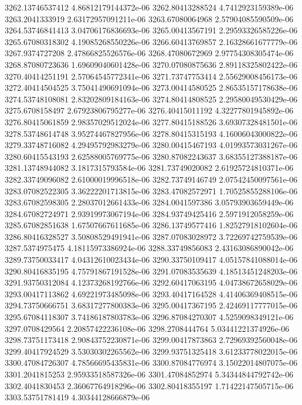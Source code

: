 {3262.13746537412 4.86812179144372e-06
3262.80413288524 4.7412923159389e-06
3263.2041333919 2.63172957091211e-06
3263.67080064968 2.57904085590509e-06
3264.53746841413 3.04706176836693e-06
3265.00413567191 2.29593326585226e-06
3265.67080318302 4.19085268550226e-06
3266.60413769857 2.16328661677779e-06
3267.9374727208 2.47866825526576e-06
3268.47080672969 2.97754308305474e-06
3268.87080723636 1.69609040601428e-06
3270.07080875636 2.89118325802422e-06
3270.40414251191 2.57064545772341e-06
3271.73747753414 2.55629008456173e-06
3272.40414504525 3.75041490691094e-06
3273.00414580525 2.86535157178638e-06
3274.53748108081 2.83202809184163e-06
3274.80414808525 2.29580049530429e-06
3275.6708158497 2.67923806795277e-06
3276.40415011192 4.32277801945892e-06
3276.80415061859 2.98357029512024e-06
3277.80415188526 3.69307328481501e-06
3278.53748614748 3.95274467827956e-06
3278.80415315193 4.16006043000822e-06
3279.33748716082 4.29495792983279e-06
3280.00415467193 4.01993573031267e-06
3280.60415543193 2.62588005769775e-06
3280.87082243637 3.68355127388187e-06
3281.13748944082 3.1817315793584e-06
3281.73749020082 2.61925724810371e-06
3282.33749096082 2.61000019996518e-06
3282.73749146749 2.07542450097561e-06
3283.07082522305 3.36222201713815e-06
3283.47082572971 1.70525855288106e-06
3283.67082598305 2.28037012661433e-06
3284.0041597386 3.05793903659449e-06
3284.67082724971 2.93919973067194e-06
3284.93749425416 2.5971912058259e-06
3285.67082851638 1.67507667611685e-06
3286.13749577416 1.82527918102604e-06
3286.80416328527 3.50808529491941e-06
3287.07083028972 3.72269742759539e-06
3287.5374975475 4.18115973386924e-06
3288.33749856083 2.43163086890042e-06
3289.73750033417 4.04312610023434e-06
3290.33750109417 4.05157841088014e-06
3290.80416835195 4.75791867191528e-06
3291.07083535639 4.18513451248203e-06
3291.93750312084 4.12373268192766e-06
3292.60417063195 4.04738672658029e-06
3293.00417113862 4.69221973485098e-06
3293.40417164528 4.41406369408515e-06
3294.73750666751 3.68317277800383e-06
3295.00417367195 2.42469117777015e-06
3295.67084118307 3.74186187803783e-06
3296.87084270307 4.5259098349121e-06
3297.0708429564 2.20857422236108e-06
3298.2708444764 5.03441221374926e-06
3298.73751173418 2.90843752230871e-06
3299.00417873863 2.72969392560048e-06
3299.40417924529 3.53030302265562e-06
3299.93751325418 3.61233778022015e-06
3300.47084726307 4.78566695435831e-06
3300.87084776974 3.15022014807075e-06
3301.2041815253 2.95933518587326e-06
3301.47084852974 5.34344844792742e-06
3302.4041830453 2.36067764918296e-06
3302.80418355197 1.71422147505715e-06
3303.53751781419 4.30344128666879e-06
}

